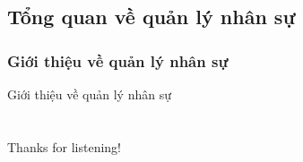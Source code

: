 \documentclass{beamer}
\begin{document}
\subsection{Tổng quan về quản lý nhân sự}
\subsubsection{Giới thiệu về quản lý nhân sự}
\begin{frame}{Giới thiệu về quản lý nhân sự}
\end{frame}

\section*{}
\begin{frame}{}
\centering
\Huge{Thanks for listening!}
\end{frame}
\end{document}
